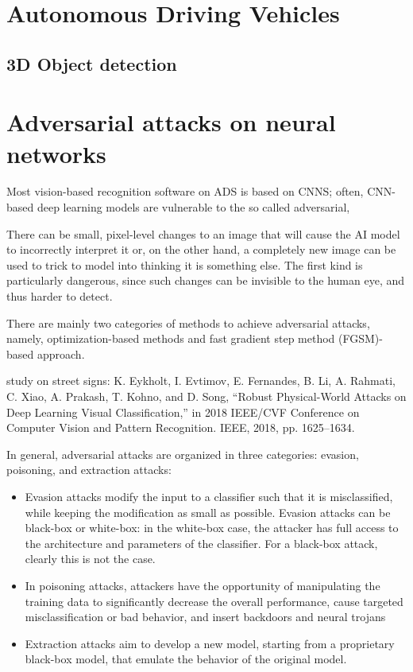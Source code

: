 \newpage
\section{Autonomous Driving Vehicles}


\subsection{3D Object detection}






\newpage
\section{Adversarial attacks on neural networks}
Most vision-based recognition software on ADS is based on CNNS; often, CNN-based deep learning models are vulnerable to the so called adversarial, 

There can be small, pixel-level changes to an image that will cause the AI model to incorrectly interpret it or, on the other hand, a completely new image can be used to trick to model into thinking it is something else. The first kind is particularly dangerous, since such changes can be invisible to the human eye, and thus harder to detect.

There are mainly two categories of methods to achieve adversarial attacks, namely, optimization-based methods and fast gradient step method (FGSM)-based approach.


study on street signs: K. Eykholt, I. Evtimov, E. Fernandes, B. Li, A. Rahmati, C. Xiao,
A. Prakash, T. Kohno, and D. Song, “Robust Physical-World Attacks on
Deep Learning Visual Classification,” in 2018 IEEE/CVF Conference on
Computer Vision and Pattern Recognition. IEEE, 2018, pp. 1625–1634.


In general, adversarial attacks are organized in three categories: evasion, poisoning, and extraction attacks:
\begin{itemize}
    \item Evasion attacks modify the input to a classifier such that it is misclassified, while keeping the modification as small as possible. Evasion attacks can be black-box or white-box: in the white-box case, the attacker has full access to the architecture and parameters of the classifier. For a black-box attack, clearly this is not the case.
    \item In poisoning attacks, attackers have the opportunity of manipulating the training data to significantly decrease the overall performance, cause targeted misclassification or bad behavior, and insert backdoors and neural trojans
    \item Extraction attacks aim to develop a new model, starting from a proprietary black-box model, that emulate the behavior of the original model.
\end{itemize}
